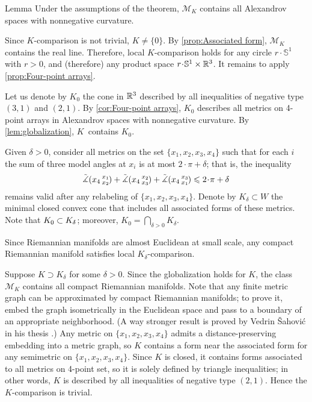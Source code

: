 \documentclass[a4paper,10pt]{article}
\begin{document}
\begin{thm}{Lemma}\label{lem:globalization}
Under the assumptions of the theorem, $\mathcal{M}_K$ contains all Alexandrov spaces with nonnegative curvature.
\end{thm}

Since $K$-comparison is not trivial, $K\ne\{0\}$.
By \ref{prop:Associated form}, $\mathcal{M}_K$ contains the real line.
Therefore, local $K$-comparison holds
for any circle $r\cdot \mathbb{S}^1$ with $r>0$, and (therefore) any product space $r\cdot \mathbb{S}^1\times\RR^3$.
It remains to apply \ref{prop:Four-point arrays}.
\qeds

Let us denote by $K_0$ the cone in $\mathbb{R}^3$ described by all inequalities of negative type $(3,1)$ and $(2,1)$.
By \ref{cor:Four-point arrays}, $K_0$ describes all metrics on 4-point arrays in Alexandrov spaces with nonnegative curvature.
By \ref{lem:globalization},  $K$~contains $K_0$.

Given $\delta>0$, consider all metrics on the set $\{x_1,x_2,x_3,x_4\}$ such that for each $i$
the sum of three model angles at $x_i$ is at most $2\cdot\pi+\delta$; that is, the inequality
\[\angk{x_4}{x_1}{x_2}+\angk{x_4}{x_2}{x_3}+\angk{x_4}{x_3}{x_1}\le 2\cdot\pi+\delta\]
remains valid after any relabeling of $\{x_1,x_2,x_3,x_4\}$.
Denote by $K_\delta\subset W$ the minimal closed convex cone that includes all associated forms of these metrics.
Note that $K_0\z\subset K_\delta$;
moreover, $K_0=\bigcap_{\delta>0} K_\delta$.

Since Riemannian manifolds are almost Euclidean at small scale,
any compact Riemannian manifold satisfies local $K_\delta$-comparison.

Suppose $K\supset K_\delta$ for some $\delta>0$.
Since the globalization holds for $K$, the class $\mathcal{M}_K$ contains all compact Riemannian manifolds.
Note that any finite metric graph can be approximated by compact Riemannian manifolds;
to prove it, embed the graph isometrically in the Euclidean space and pass to a boundary of an appropriate
neighborhood.
(A way stronger result is proved by Vedrin Šahović in his thesis \cite{sahovic2009}.)
Any metric on $\{x_1,x_2,x_3,x_4\}$ admits a distance-preserving embedding into a metric graph, so $K$ contains a form near the associated form for any semimetric on $\{x_1,x_2,x_3,x_4\}$.
Since $K$ is closed, it contains forms associated to all metrics on 4-point set, so it is solely defined by triangle inequalities;
in other words, $K$ is described by all inequalities of negative type $(2,1)$.
Hence the $K$-comparison is trivial.
\end{document}
